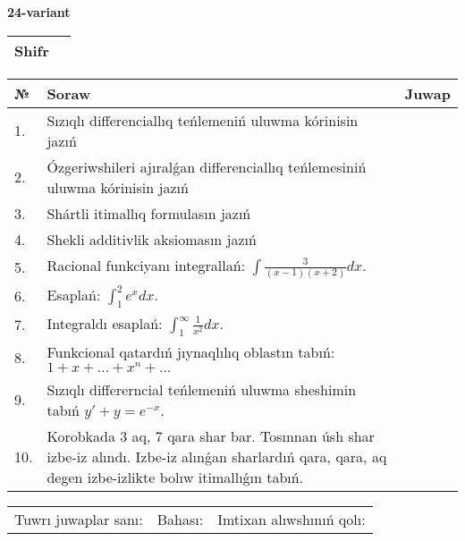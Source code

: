 \documentclass{article}
\begin{document}
  \egroup
  
  \newpage
  
  
  \textbf{24-variant}\\
  
  \bgroup
  \def\arraystretch{1.6} %
  
  \begin{tabular}{|m{5.7cm}|m{9.5cm}|}
  \hline
  Shifr & \\
  \hline
  \end{tabular}
  
  \vspace{1cm}
  
  \begin{tabular}{|m{0.7cm}|m{10cm}|m{4cm}|}
  \hline
  № & Soraw & Juwap \\
  \hline
  1. & Sızıqlı differenciallıq teńlemeniń uluwma kórinisin jazıń &  \\
  \hline
  2. & Ózgeriwshileri ajıralǵan differenciallıq teńlemesiniń uluwma kórinisin jazıń &  \\
  \hline
  3. & Shártli itimallıq formulasın jazıń &  \\
  \hline
  4. & Shekli additivlik aksiomasın jazıń &  \\
  \hline
  5. & Racional funkciyanı integrallań: \(\int{\frac{3}{(x - 1)(x + 2)}dx}\). &  \\
  \hline
  6. & Esaplań: \(\int_{1}^2 {e^{x}dx}\). &  \\
  \hline
  7. & Integraldı esaplań: \(\int_{1}^{\infty}{\frac{1}{x^2 }dx}\). &  \\
  \hline
  8. & Funkcional qatardıń jıynaqlılıq oblastın tabıń:\(1 + x + ... + x^{n} + ...\) &  \\
  \hline
  9. & Sızıqlı differerncial teńlemeniń uluwma sheshimin tabıń \(y' + y = e^{- x}\). &  \\
  \hline
  10. & Korobkada 3 aq, 7 qara shar bar. Tosınnan úsh shar izbe-iz alındı. Izbe-iz alınǵan sharlardıń qara, qara, aq degen izbe-izlikte bolıw itimallıǵın tabıń. &  \\
  \hline
  \end{tabular}
  
  \vspace{1cm}
  
  \begin{tabular}{lll}
  Tuwrı juwaplar sanı: \underline{\hspace{1.5cm}} & 
  Bahası: \underline{\hspace{1.5cm}} & 
  Imtixan alıwshınıń qolı: \underline{\hspace{2cm}} \\
  \end{tabular}
  
\end{document}
